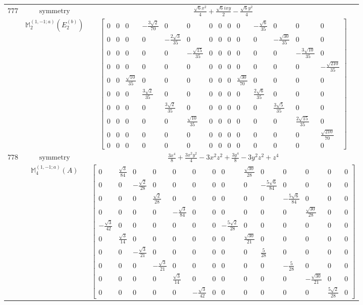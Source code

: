 \documentclass[fleqn,8pt,landscape]{jsarticle}
\begin{document}
\begin{longtable}{ccc}
$ 777 $ & $ \text{symmetry} $ & $ \frac{\sqrt{6} x^{2}}{4} + \frac{\sqrt{6} i x y}{2} - \frac{\sqrt{6} y^{2}}{4} $ \\
$  $ & $ \mathbb{M}_{2}^{(1,-1;a)}(E_{2}^{(b)}) $ & $ \begin{bmatrix} 0 & 0 & 0 & - \frac{3 \sqrt{2}}{70} & 0 & 0 & 0 & 0 & 0 & 0 & - \frac{\sqrt{6}}{35} & 0 & 0 & 0 \\ 0 & 0 & 0 & 0 & - \frac{2 \sqrt{3}}{35} & 0 & 0 & 0 & 0 & 0 & 0 & - \frac{\sqrt{30}}{35} & 0 & 0 \\ 0 & 0 & 0 & 0 & 0 & - \frac{\sqrt{15}}{35} & 0 & 0 & 0 & 0 & 0 & 0 & - \frac{3 \sqrt{10}}{35} & 0 \\ 0 & 0 & 0 & 0 & 0 & 0 & 0 & 0 & 0 & 0 & 0 & 0 & 0 & - \frac{\sqrt{210}}{35} \\ 0 & 0 & \frac{\sqrt{10}}{35} & 0 & 0 & 0 & 0 & 0 & 0 & \frac{\sqrt{30}}{70} & 0 & 0 & 0 & 0 \\ 0 & 0 & 0 & \frac{3 \sqrt{2}}{35} & 0 & 0 & 0 & 0 & 0 & 0 & \frac{2 \sqrt{6}}{35} & 0 & 0 & 0 \\ 0 & 0 & 0 & 0 & \frac{3 \sqrt{2}}{35} & 0 & 0 & 0 & 0 & 0 & 0 & \frac{3 \sqrt{5}}{35} & 0 & 0 \\ 0 & 0 & 0 & 0 & 0 & \frac{\sqrt{10}}{35} & 0 & 0 & 0 & 0 & 0 & 0 & \frac{2 \sqrt{15}}{35} & 0 \\ 0 & 0 & 0 & 0 & 0 & 0 & 0 & 0 & 0 & 0 & 0 & 0 & 0 & \frac{\sqrt{210}}{70} \\ 0 & 0 & 0 & 0 & 0 & 0 & 0 & 0 & 0 & 0 & 0 & 0 & 0 & 0 \end{bmatrix} $ \\ \hline
$ 778 $ & $ \text{symmetry} $ & $ \frac{3 x^{4}}{8} + \frac{3 x^{2} y^{2}}{4} - 3 x^{2} z^{2} + \frac{3 y^{4}}{8} - 3 y^{2} z^{2} + z^{4} $ \\
$  $ & $ \mathbb{M}_{4}^{(1,-1;a)}(A) $ & $ \begin{bmatrix} 0 & \frac{\sqrt{3}}{84} & 0 & 0 & 0 & 0 & 0 & 0 & \frac{\sqrt{30}}{28} & 0 & 0 & 0 & 0 & 0 \\ 0 & 0 & - \frac{\sqrt{2}}{28} & 0 & 0 & 0 & 0 & 0 & 0 & - \frac{5 \sqrt{6}}{84} & 0 & 0 & 0 & 0 \\ 0 & 0 & 0 & \frac{\sqrt{2}}{28} & 0 & 0 & 0 & 0 & 0 & 0 & - \frac{5 \sqrt{6}}{84} & 0 & 0 & 0 \\ 0 & 0 & 0 & 0 & - \frac{\sqrt{3}}{84} & 0 & 0 & 0 & 0 & 0 & 0 & \frac{\sqrt{30}}{28} & 0 & 0 \\ - \frac{\sqrt{3}}{42} & 0 & 0 & 0 & 0 & 0 & 0 & - \frac{5 \sqrt{2}}{28} & 0 & 0 & 0 & 0 & 0 & 0 \\ 0 & \frac{\sqrt{3}}{14} & 0 & 0 & 0 & 0 & 0 & 0 & \frac{\sqrt{30}}{21} & 0 & 0 & 0 & 0 & 0 \\ 0 & 0 & - \frac{\sqrt{3}}{21} & 0 & 0 & 0 & 0 & 0 & 0 & \frac{5}{28} & 0 & 0 & 0 & 0 \\ 0 & 0 & 0 & - \frac{\sqrt{3}}{21} & 0 & 0 & 0 & 0 & 0 & 0 & - \frac{5}{28} & 0 & 0 & 0 \\ 0 & 0 & 0 & 0 & \frac{\sqrt{3}}{14} & 0 & 0 & 0 & 0 & 0 & 0 & - \frac{\sqrt{30}}{21} & 0 & 0 \\ 0 & 0 & 0 & 0 & 0 & - \frac{\sqrt{3}}{42} & 0 & 0 & 0 & 0 & 0 & 0 & \frac{5 \sqrt{2}}{28} & 0 \end{bmatrix} $ \\ \hline

\end{longtable}
\end{document}

